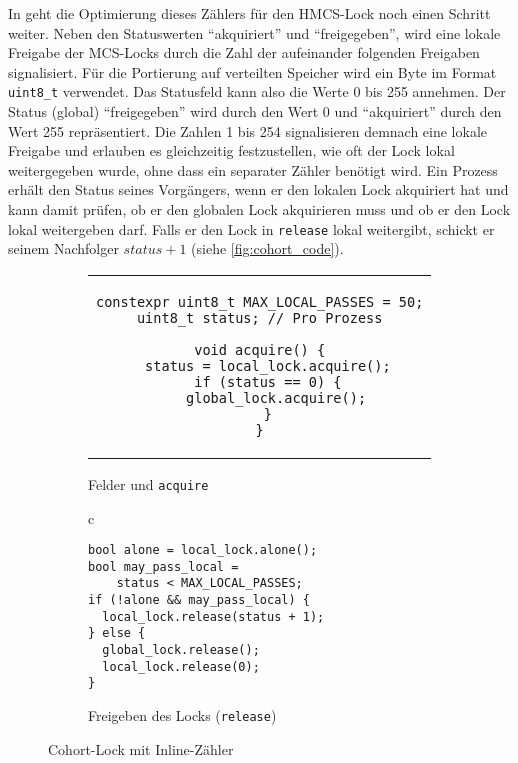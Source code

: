 In \cite{HMCS-Lock} geht die Optimierung dieses Zählers für den HMCS-Lock noch einen Schritt weiter.
Neben den Statuswerten \enquote{akquiriert} und \enquote{freigegeben},
wird eine lokale Freigabe der MCS-Locks durch die Zahl der aufeinander folgenden Freigaben signalisiert.
Für die Portierung auf verteilten Speicher wird ein Byte im Format \texttt{uint8\_t} verwendet.
Das Statusfeld kann also die Werte 0 bis 255 annehmen.
Der Status (global) \enquote{freigegeben} wird durch den Wert 0
und \enquote{akquiriert} durch den Wert 255 repräsentiert.
Die Zahlen 1 bis 254 signalisieren demnach eine lokale Freigabe
und erlauben es gleichzeitig festzustellen,
wie oft der Lock lokal weitergegeben wurde,
ohne dass ein separater Zähler benötigt wird.
Ein Prozess erhält den Status seines Vorgängers,
wenn er den lokalen Lock akquiriert hat
und kann damit prüfen,
ob er den globalen Lock akquirieren muss
und ob er den Lock lokal weitergeben darf.
Falls er den Lock in \texttt{release} lokal weitergibt,
schickt er seinem Nachfolger $status + 1$ (siehe \autoref{fig:cohort_code}).

\begin{figure}[h]
    \begin{subfigure}[b]{.5\textwidth}
        \centering
        \begin{tabular}{c}\begin{lstlisting}
constexpr uint8_t MAX_LOCAL_PASSES = 50;
uint8_t status; // Pro Prozess

void acquire() {
  status = local_lock.acquire();
  if (status == 0) {
    global_lock.acquire();
  }
}
        \end{lstlisting}\end{tabular}
        \caption{Felder und \texttt{acquire}}
        \label{fig:cohort_acquire}
    \end{subfigure}
    \begin{subfigure}[b]{.5\textwidth}
        \centering
        \begin{tabular}{c}\begin{lstlisting}
bool alone = local_lock.alone();
bool may_pass_local =
    status < MAX_LOCAL_PASSES;
if (!alone && may_pass_local) {
  local_lock.release(status + 1);
} else {
  global_lock.release();
  local_lock.release(0);
}
        \end{lstlisting}\end{tabular}
        \caption{Freigeben des Locks (\texttt{release})}
        \label{fig:cohort_release}
    \end{subfigure}
    \caption{Cohort-Lock mit Inline-Zähler}
    \label{fig:cohort_code}
\end{figure}

